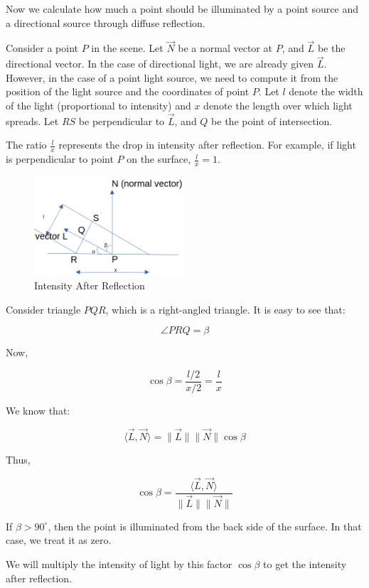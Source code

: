 \documentclass{article}
\begin{document}
Now we calculate how much a point should be illuminated by a point source and a directional source through diffuse reflection.

Consider a point $P$ in the scene. Let $\vec{N}$ be a normal vector at $P$, and $\vec{L}$ be the directional vector. In the case of directional light, we are already given $\vec{L}$. However, in the case of a point light source, we need to compute it from the position of the light source and the coordinates of point $P$. Let $l$ denote the width of the light (proportional to intensity) and $x$ denote the length over which light spreads. Let $RS$ be perpendicular to $\vec{L}$, and $Q$ be the point of intersection.

The ratio $\frac{l}{x}$ represents the drop in intensity after reflection. For example, if light is perpendicular to point $P$ on the surface, $\frac{l}{x} = 1$.

\begin{figure}[h]
    \centering
    \includegraphics[width=0.5\textwidth]{./figs/intensity.png}
    \caption{Intensity After Reflection}
\end{figure}

Consider triangle $PQR$, which is a right-angled triangle. It is easy to see that:

$$\angle PRQ = \beta$$

Now,

$$\cos \beta = \frac{l/2}{x/2} = \frac{l}{x}$$

We know that:

$$\langle \vec{L}, \vec{N} \rangle = \|\vec{L}\| \|\vec{N}\| \cos \beta$$

Thus,

$$\cos \beta = \frac{\langle \vec{L}, \vec{N} \rangle}{\|\vec{L}\| \|\vec{N}\|}$$

If $\beta > 90^\circ$, then the point is illuminated from the back side of the surface. In that case, we treat it as zero.

We will multiply the intensity of light by this factor $\cos \beta$ to get the intensity after reflection.
\end{document}

